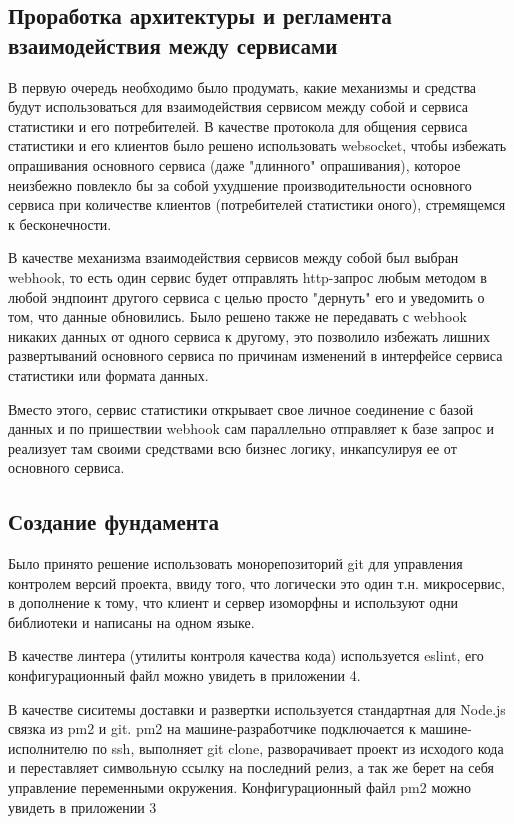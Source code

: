 \documentclass[a4paper, 12pt]{article}
\begin{document}
    \subsection*{Проработка архитектуры и регламента взаимодействия между сервисами}
    В первую очередь необходимо было продумать, какие механизмы и средства будут использоваться для взаимодействия
    сервисом между собой и сервиса статистики и его потребителей. В качестве протокола для общения сервиса статистики и его клиентов
    было решено использовать websocket, чтобы избежать опрашивания основного
    сервиса (даже "длинного" опрашивания), которое неизбежно повлекло бы за собой ухудшение производительности основного сервиса
    при количестве клиентов (потребителей статистики оного), стремящемся к бесконечности.

    В качестве механизма взаимодействия сервисов между собой был выбран webhook, то есть один сервис будет
    отправлять http-запрос любым методом в любой эндпоинт другого сервиса с целью просто "дернуть" его и уведомить
    о том, что данные обновились. Было решено также не передавать с webhook никаких данных от одного сервиса к другому,
    это позволило избежать лишних развертываний основного сервиса по причинам изменений в интерфейсе сервиса статистики или формата данных.

    Вместо этого, сервис статистики открывает свое личное соединение с базой данных и по пришествии webhook сам
    параллельно отправляет к базе запрос и реализует там своими средствами всю бизнес логику, инкапсулируя ее от основного сервиса.

    \subsection*{Создание фундамента}
    Было принято решение использовать монорепозиторий git для управления контролем версий проекта, ввиду того, что
    логически это один т.н. микросервис, в дополнение к тому, что клиент и сервер изоморфны и используют одни библиотеки
    и написаны на одном языке.

    В качестве линтера (утилиты контроля качества кода) используется eslint, его конфигурационный файл можно увидеть в
    приложении 4.

    В качестве сиситемы доставки и развертки используется стандартная для Node.js связка из pm2 и git. pm2 на машине-разработчике
    подключается к машине-исполнителю по ssh, выполняет git clone, разворачивает проект из исходого кода и переставляет символьную ссылку
    на последний релиз, а так же берет на себя управление переменными окружения. Конфигурационный файл pm2 можно увидеть
    в приложении 3
\end{document}
